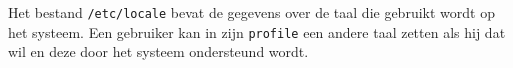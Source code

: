 Het bestand \texttt{/etc/locale} bevat de gegevens over de taal die gebruikt wordt op het systeem. Een gebruiker kan in zijn \texttt{profile} een andere taal zetten als hij dat wil en deze door het systeem ondersteund wordt.

